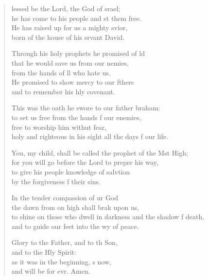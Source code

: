 \begin{verse}
  \begin{patverse}
lessed be the Lord, the God of srael;\Med\\
he has come to his people and st them free.\\
He has raised up for us a mighty svior,\Med\\
born of the house of his srvant David.

Through his holy prophets he promised of ld\Flex\\
that he would save us from our nemies,\Med\\
from the hands of ll who hate us.\\
He promised to show mercy to our fthers\Med\\
and to remember his hly covenant.

This was the oath he swore to our father braham:\Med\\
to set us free from the hands f our enemies,\\
free to worship him withut fear,\Med\\
holy and righteous in his sight all the days f our life. 

You, my child, shall be called the prophet of the Mst High;\Med\\
for you will go before the Lord to prepre his way,\\
to give his people knowledge of salvtion\Med\\
by the forgiveness f their sins.

In the tender compassion of ur God\Med\\
the dawn from on high shall brak upon us,\\
to shine on those who dwell in darkness and the shadow f death,\Med\\
and to guide our feet into the wy of peace.

Glory to the Father, and to th Son,\Med\\
and to the Hly Spirit:\\
as it was in the beginning, \pointup{\i}s now,\Med\\
and will be for evr. Amen.
  \end{patverse}
  \end{verse}
